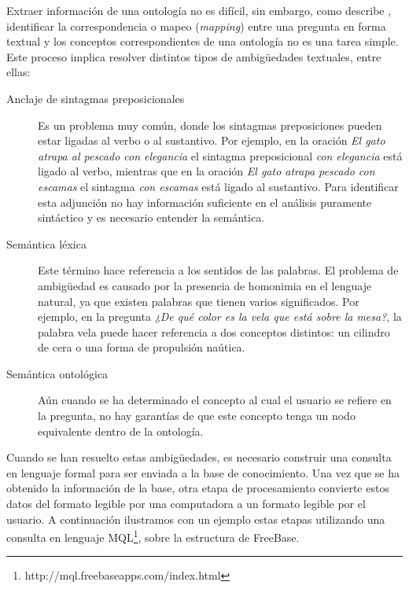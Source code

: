 Extraer información de una ontología no es difícil, sin embargo, como describe \citet{ungerQALD}, identificar la correspondencia o mapeo (\textit{mapping}) entre una pregunta en forma textual y los conceptos correspondientes de una ontología no es una tarea simple. Este proceso implica resolver distintos tipos de ambigüedades textuales, entre ellas:

\begin{description}
    \item[Anclaje de sintagmas preposicionales] Es un problema muy común, donde los sintagmas preposiciones pueden estar ligadas al verbo o al sustantivo. Por ejemplo, en la oración \textit{El gato atrapa al pescado con elegancia} el sintagma preposicional \textit{con elegancia} está ligado al verbo, mientras que en la oración \textit{El gato atrapa pescado con escamas} el sintagma \textit{con escamas} está ligado al sustantivo. Para identificar esta adjunción no hay información suficiente en el análisis puramente sintáctico y es necesario entender la semántica.
    \item[Semántica léxica] Este término hace referencia a los sentidos de las palabras. El problema de ambigüedad es causado por la presencia de homonimia en el lenguaje natural, ya que existen palabras que tienen varios significados. Por ejemplo, en la pregunta \textit{¿De qué color es la vela que está sobre la mesa?}, la palabra vela puede hacer referencia a dos conceptos distintos: un cilindro de cera o una forma de propulsión naútica.
    \item[Semántica ontológica] Aún cuando se ha determinado el concepto al cual el usuario se refiere en la pregunta, no hay garantías de que este concepto tenga un nodo equivalente dentro de la ontología.
\end{description}

Cuando se han resuelto estas ambigüedades, es necesario construir una consulta en lenguaje formal para ser enviada a la base de conocimiento. Una vez que se ha obtenido la información de la base, otra etapa de procesamiento convierte estos datos del formato legible por una computadora a un formato legible por el usuario. A continuación ilustramos con un ejemplo estas etapas utilizando una consulta en lenguaje MQL\footnote{http://mql.freebaseapps.com/index.html}, sobre la estructura de FreeBase.

